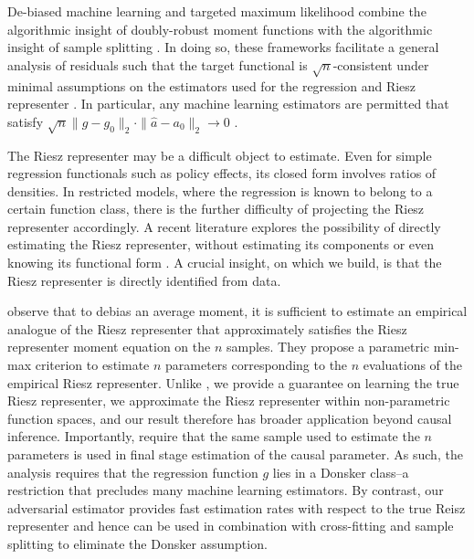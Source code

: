 De-biased machine learning and targeted maximum likelihood combine the algorithmic insight of doubly-robust moment functions with the algorithmic insight of sample splitting \cite{bickel1982adaptive,schick1986asymptotically,klaassen1987consistent,vaart,robins2008higher}.  In doing so, these frameworks facilitate a general analysis of residuals such that the target functional is $\sqrt{n}$-consistent under minimal assumptions on the estimators used for the regression and Riesz representer \cite{scharfstein1999adjusting,rubin2005general,rubin2006extending,van2006targeted,zheng2010asymptotic,van2011targeted,diaz2013targeted,van2014targeted,kennedy2017nonparametric,kennedy2020optimal}. In particular, any machine learning estimators are permitted that satisfy $\sqrt{n}\|\hat{g}-g_0\|_2\cdot\|\hat{a}-a_0\|_2\rightarrow 0$ \cite{chernozhukov2018double,chernozhukov2016locally}.

The Riesz representer may be a difficult object to estimate. Even for simple regression functionals such as policy effects, its closed form involves ratios of densities. In restricted models, where the regression is known to belong to a certain function class, there is the further difficulty of projecting the Riesz representer accordingly. A recent literature explores the possibility of directly estimating the Riesz representer, without estimating its components or even knowing its functional form \cite{robins2007comment,newey2018cross,athey2018approximate,chernozhukov2018global,chernozhukov2018learning,hirshberg2018debiased,hirshberg2019augmented,singh2019biased,rothenhausler2019incremental}. A crucial insight, on which we build, is that the Riesz representer is directly identified from data. 

\cite{hirshberg2019augmented} observe that to debias an average moment, it is sufficient to estimate an empirical analogue of the Riesz representer that approximately satisfies the Riesz representer moment equation on the $n$ samples. They propose a parametric min-max criterion to estimate $n$ parameters corresponding to the $n$ evaluations of the empirical Riesz representer. Unlike \cite{hirshberg2019augmented}, we provide a guarantee on learning the true Riesz representer, we approximate the Riesz representer within non-parametric function spaces, and our result therefore has broader application beyond causal inference. Importantly, \cite{hirshberg2019augmented} require that the same sample used to estimate the $n$ parameters is used in final stage estimation of the causal parameter. As such, the analysis requires that the regression function $g$ lies in a Donsker class--a restriction that precludes many machine learning estimators. By contrast, our adversarial estimator provides fast estimation rates with respect to the true Reisz representer and hence can be used in combination with cross-fitting and sample splitting to eliminate the Donsker assumption.


